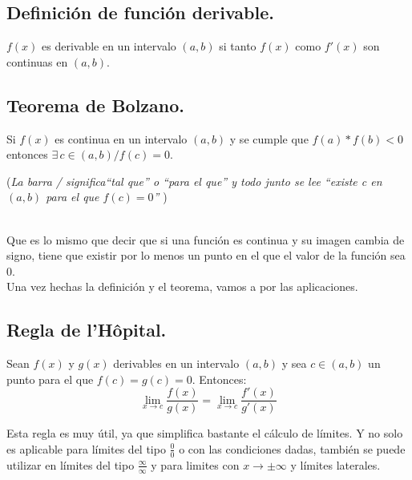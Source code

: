 \documentclass[a4paper,11pt,answers]{exam}
\begin{document}
\subsection{Definición de función derivable.}
$f(x)$ es derivable en un intervalo $(a, b)$ si tanto $f(x)$ como $f'(x)$ son continuas en $(a, b)$.

\subsection{Teorema de Bolzano.}
Si $f(x)$ es continua en un intervalo $(a, b)$ y se cumple que $f(a)*f(b) < 0$ entonces $\exists\,c \in (a, b) / f(c) = 0$.\\
\begin{small}(\textit{La barra / significa``tal que'' o ``para el que'' y todo junto se lee ``existe c en $(a, b)$ para el que $f(c) = 0$'' })\end{small}\\
Que es lo mismo que decir que si una función es continua y su imagen cambia de signo, tiene que existir por lo menos un punto en el que el valor de la función sea 0.\\

Una vez hechas la definición y el teorema, vamos a por las aplicaciones.

\subsection{Regla de l'Hôpital.}
Sean $f(x)$ y $g(x)$ derivables en un intervalo $(a, b)$ y sea $c \in (a, b)$ un punto para el que $f(c) = g(c) = 0$. Entonces:
\[\lim_{x \to c} \frac{f(x)}{g(x)} = \lim_{x \to c} \frac{f'(x)}{g'(x)}\]

Esta regla es muy útil, ya que simplifica bastante el cálculo de límites. Y no solo es aplicable para límites del tipo $\frac{0}{0}$ o con las condiciones dadas, también se puede utilizar en límites del tipo $\frac{\infty}{\infty}$ y para limites con $x \to \pm\infty$ y límites laterales.\\
\end{document}
